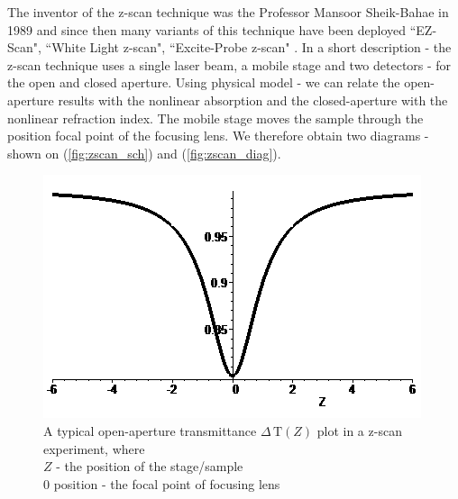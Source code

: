 \documentclass[12pt,twoside,a4paper]{article}
\numberwithin{equation}{subsection}
\numberwithin{figure}{subsection}
\begin{document}
The inventor of the z-scan technique was the Professor Mansoor Sheik-Bahae in 1989 \cite{bahae_sensitive} and since then many variants of this technique have been deployed ``EZ-Scan", ``White Light z-scan", ``Excite-Probe z-scan" \cite{newport_application}. In a short description - the z-scan technique uses a single laser beam, a mobile stage and two detectors - for the open and closed aperture. Using physical model - we can relate the open-aperture results with the nonlinear absorption and the closed-aperture with the nonlinear refraction index. The mobile stage moves the sample through the position focal point of the focusing lens. We therefore obtain two diagrams - shown on (\ref{fig:zscan_sch}) and (\ref{fig:zscan_diag}).


\begin{figure}
  \includegraphics{img/oa_plot.png}
  \caption{A typical open-aperture transmittance $\Delta \,\mathrm{T}(Z)$ plot in a z-scan experiment, where \\ 
  $Z$ - the position of the stage/sample \\ 
  $0$ position - the focal point of focusing lens 
  \label{fig:oa_plot}}
\end{figure}
\end{document}
